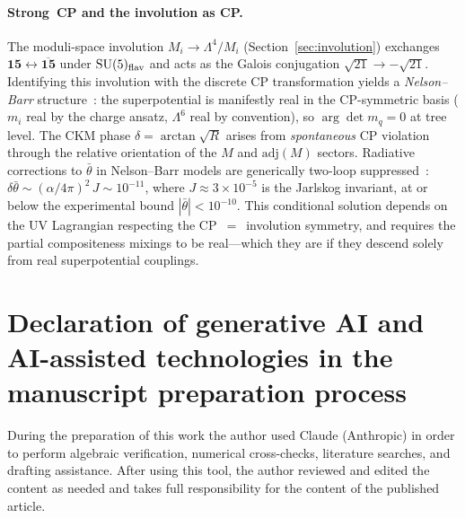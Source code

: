 \documentclass[12pt,a4paper]{article}
\newcommand{\SU}{\mathrm{SU}}
\newcommand{\adj}{\mathrm{adj}}
\begin{document}
\paragraph{Strong~CP and the involution as CP.}
The moduli-space involution
$M_i \to \Lambda^4/M_i$
(Section~\ref{sec:involution}) exchanges
$\mathbf{15}\leftrightarrow\overline{\mathbf{15}}$ under
$\SU(5)_{\rm flav}$ and acts as the Galois conjugation
$\sqrt{21}\to -\sqrt{21}$.  Identifying this involution with
the discrete CP transformation yields a \emph{Nelson--Barr}
structure~\cite{Nelson:1984,Barr:1984}:
the superpotential is manifestly real in the CP-symmetric basis
($m_i$ real by the charge ansatz, $\Lambda^6$ real by convention),
so $\arg\det m_q = 0$ at tree level.  The CKM phase
$\delta = \arctan\!\sqrt{R}$ arises from \emph{spontaneous} CP
violation through the relative orientation of the $M$ and
$\adj(M)$ sectors.
Radiative corrections to $\bar\theta$ in Nelson--Barr models
are generically two-loop suppressed~\cite{Barr:1984}:
$\delta\bar\theta \sim (\alpha/4\pi)^2\,J
\sim 10^{-11}$, where $J \approx 3 \times 10^{-5}$ is the
Jarlskog invariant, at or below the experimental
bound $|\bar\theta| < 10^{-10}$.
This conditional solution depends on the UV Lagrangian
respecting the CP~$=$~involution symmetry, and requires
the partial compositeness mixings to be real---which they are
if they descend solely from real superpotential couplings.


\section*{Declaration of generative AI and AI-assisted technologies
  in the manuscript preparation process}

During the preparation of this work the author used Claude
(Anthropic) in order to perform algebraic verification, numerical
cross-checks, literature searches, and drafting assistance.
After using this tool, the author reviewed and edited the content
as needed and takes full responsibility for the content of the
published article.
\end{document}
